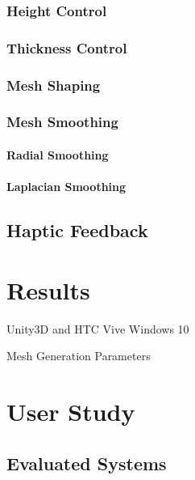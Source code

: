 \subsubsection{Height Control}
\label{sec:3}

\subsubsection{Thickness Control}
\label{sec:3}

\subsubsection{Mesh Shaping}
\label{sec:3}

\subsubsection{Mesh Smoothing}
\label{sec:3}

\paragraph{Radial Smoothing}

\paragraph{Laplacian Smoothing}


\subsection{Haptic Feedback}
\label{sec:2}







\section{Results}
\label{sec:1}

Unity3D and HTC Vive
Windows 10

Mesh Generation Parameters




\section{User Study}
\label{sec:1}

\subsection{Evaluated Systems}
\label{sec:2}

